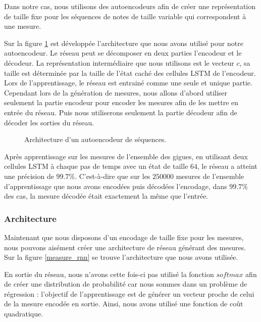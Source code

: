 Dans notre cas, nous utilisons des autoencodeurs afin de créer une représentation de taille fixe pour les séquences de notes de taille variable qui correspondent à une mesure.

Sur la figure \ref{autoencoder} est développée l'architecture que nous avons utilisé pour notre autoencodeur. Le réseau peut se décomposer en deux parties l'encodeur et le décodeur. La représentation intermédiaire que nous utilisons est le vecteur $c$, sa taille est déterminée par la taille de l'état caché des cellules LSTM de l'encodeur. Lors de l'apprentissage, le réseau est entrainé comme une seule et unique partie. Cependant lors de la génération de mesures, nous allons d'abord utiliser seulement la partie encodeur pour encoder les mesures afin de les mettre en entrée du réseau. Puis nous utiliserons seulement la partie décodeur afin de décoder les sorties du réseau. 

\begin{figure}[h!]
\begin{center}

\caption{Architecture d'un autoencodeur de séquences.}
\label{autoencoder}
\end{center}
\end{figure}

Après apprentissage sur les mesures de l'ensemble des gigues, en utilisant deux cellules LSTM à chaque pas de temps avec un état de taille $64$, le réseau a atteint une précision de $99.7\%$. C'est-à-dire que sur les $250000$ mesures de l'ensemble d'apprentissage que nous avons encodées puis décodées l'encodage, dans $99.7\%$ des cas, la mesure décodée était exactement la même que l'entrée.

\subsubsection{Architecture}

Maintenant que nous disposons d'un encodage de taille fixe pour les mesures, nous pouvons aisément créer une architecture de réseau générant des mesures. Sur la figure \ref{measure_rnn} se trouve l'architecture que nous avons utilisée.

En sortie du réseau, nous n'avons cette fois-ci pas utilisé la fonction $softmax$ afin de créer une distribution de probabilité car nous sommes dans un problème de régression : l'objectif de l'apprentissage est de générer un vecteur proche de celui de la mesure encodée en sortie. Ainsi, nous avons utilisé une fonction de coût quadratique.

